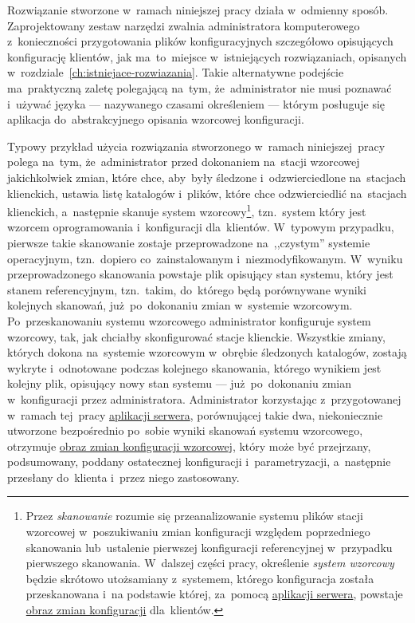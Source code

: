 \documentclass[thesis]{subfiles}
\begin{document}
Rozwiązanie stworzone w~ramach niniejszej pracy działa w~odmienny sposób. Zaprojektowany zestaw narzędzi zwalnia administratora komputerowego z~konieczności przygotowania plików konfiguracyjnych szczegółowo opisujących konfigurację klientów, jak ma~to~miejsce w~istniejących rozwiązaniach, opisanych w~rozdziale~\ref{ch:istniejace-rozwiazania}. Takie alternatywne podejście ma~praktyczną zaletę polegającą na~tym, że~administrator nie musi poznawać i~używać języka --- nazywanego czasami określeniem  --- którym posługuje się aplikacja do~abstrakcyjnego opisania wzorcowej konfiguracji.

Typowy przykład użycia rozwiązania stworzonego w~ramach niniejszej~pracy polega na~tym, że~administrator przed dokonaniem na~stacji wzorcowej jakichkolwiek zmian, które chce, aby~były śledzone i~odzwierciedlone na~stacjach klienckich, ustawia listę katalogów i~plików, które chce odzwierciedlić na~stacjach klienckich, a~następnie skanuje system wzorcowy\footnote{Przez \emph{skanowanie} rozumie się przeanalizowanie systemu plików stacji wzorcowej w~poszukiwaniu zmian konfiguracji względem poprzedniego skanowania lub~ustalenie pierwszej konfiguracji referencyjnej w~przypadku pierwszego skanowania. W~dalszej części pracy, określenie \emph{system wzorcowy} będzie skrótowo utożsamiany z~systemem, którego konfiguracja została przeskanowana i~na podstawie której, za~pomocą \hyperref[sec:srv-app]{aplikacji serwera}, powstaje \hyperref[sec:obraz-zmian-konfiguracji]{obraz zmian konfiguracji} dla~klientów.}, tzn.~system który jest wzorcem oprogramowania i~konfiguracji dla~klientów. W~typowym przypadku, pierwsze takie skanowanie zostaje przeprowadzone na~,,czystym'' systemie operacyjnym, tzn.~dopiero co~zainstalowanym i~niezmodyfikowanym. W~wyniku przeprowadzonego skanowania powstaje plik opisujący stan systemu, który jest stanem referencyjnym, tzn.~takim, do~którego będą porównywane wyniki kolejnych skanowań, już~po~dokonaniu zmian w~systemie wzorcowym. Po~przeskanowaniu systemu wzorcowego administrator konfiguruje system wzorcowy, tak, jak chciałby skonfigurować stacje klienckie. Wszystkie zmiany, których dokona na~systemie wzorcowym w~obrębie śledzonych katalogów, zostają wykryte i~odnotowane podczas kolejnego skanowania, którego wynikiem jest kolejny plik, opisujący nowy stan systemu --- już~po~dokonaniu zmian w~konfiguracji przez administratora. Administrator korzystając z~przygotowanej w~ramach tej~pracy \hyperref[sec:srv-app]{aplikacji serwera}, porównującej takie dwa, niekoniecznie utworzone bezpośrednio po~sobie wyniki skanowań systemu wzorcowego, otrzymuje \hyperref[sec:obraz-zmian-konfiguracji]{obraz zmian konfiguracji wzorcowej}, który może być przejrzany, podsumowany, poddany ostatecznej konfiguracji i~parametryzacji, a~następnie przesłany do~klienta i~przez niego zastosowany.%
\end{document}
